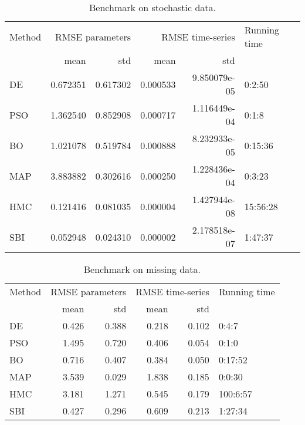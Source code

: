 \documentclass[12pt]{article}
\begin{document}
\begin{table}[p]
    \centering
    \begin{tabular}{lrrrrl}
    {Method} & \multicolumn{2}{r}{RMSE parameters} & \multicolumn{2}{r}{RMSE time-series} & Running time \\
    {} &            mean &       std &             mean & std \\
    \midrule
    DE     &        0.672351 &  0.617302 &         0.000533 &  9.850079e-05 &       0:2:50 \\
    PSO    &        1.362540 &  0.852908 &         0.000717 &  1.116449e-04 &        0:1:8 \\
    BO     &        1.021078 &  0.519784 &         0.000888 &  8.232933e-05 &      0:15:36 \\
    MAP    &        3.883882 &  0.302616 &         0.000250 &  1.228436e-04 &       0:3:23 \\
    HMC    &        0.121416 &  0.081035 &         0.000004 &  1.427944e-08 &     15:56:28 \\
    SBI    &        0.052948 &  0.024310 &         0.000002 &  2.178518e-07 &      1:47:37 \\
\end{tabular}
\caption{Benchmark on stochastic data.}
\label{tab:SDEdata}
\end{table}


\begin{table}[p]
    \centering
    \begin{tabular}{lrrrrl}
    {Method} & \multicolumn{2}{r}{RMSE parameters} & \multicolumn{2}{r}{RMSE time-series} & Running time \\
    {} &            mean &       std &             mean & std \\
    \midrule
    DE & 0.426 & 0.388 & 0.218 & 0.102 & 0:4:7 \\
    PSO & 1.495 & 0.720 & 0.406 & 0.054 & 0:1:0 \\
    BO & 0.716 & 0.407 & 0.384 & 0.050 & 0:17:52 \\
    MAP & 3.539 & 0.029 & 1.838 & 0.185 & 0:0:30 \\
    HMC & 3.181 & 1.271 & 0.545 & 0.179 & 100:6:57 \\
    SBI & 0.427 & 0.296 & 0.609 & 0.213 & 1:27:34 \\
    \end{tabular}
\caption{Benchmark on missing data. }
\label{tab:Missingdata}
\end{table}
\end{document}
